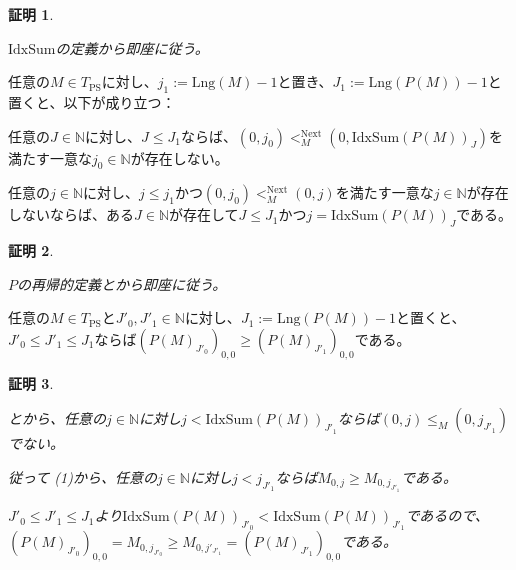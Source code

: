 \documentclass[dvipdfmx,uplatex]{jsarticle}
\theoremstyle{customnonumberbreakfortheorem}
\theoremstyle{customnonumberbreakforproof}
\newtheorem{hideableproof}{証明}
\begin{document}
\begin{hideableproof}
	\begin{indented}
		\item \(\textrm{IdxSum}\)の定義から即座に従う。
	\end{indented}
\end{hideableproof}

\begin{corollary}\label{PとIdxSumの合成の特徴付け}
	任意の\(M \in T_{\textrm{PS}}\)に対し、\(j_1 := \textrm{Lng}(M)-1\)と置き、\(J_1 := \textrm{Lng}(P(M))-1\)と置くと、以下が成り立つ：
	\begin{penumerate}
		\item 任意の\(J \in \mathbb{N}\)に対し、\(J \leq J_1\)ならば、\((0,j_0) <_M^{\textrm{Next}} (0,\textrm{IdxSum}(P(M))_J)\)を満たす一意な\(j_0 \in \mathbb{N}\)が存在しない。
		\item 任意の\(j \in \mathbb{N}\)に対し、\(j \leq j_1\)かつ\((0,j_0) <_M^{\textrm{Next}} (0,j)\)を満たす一意な\(j \in \mathbb{N}\)が存在しないならば、ある\(J \in \mathbb{N}\)が存在して\(J \leq J_1\)かつ\(j = \textrm{IdxSum}(P(M))_J\)である。
	\end{penumerate}
\end{corollary}

\begin{hideableproof}
	\begin{indented}
		\item \(P\)の再帰的定義とから即座に従う。
	\end{indented}
\end{hideableproof}

\begin{proposition}[\(P\)の各成分の左端の単調性]\label{Pの各成分の左端の単調性}
	任意の\(M \in T_{\textrm{PS}}\)と\(J'_0,J'_1 \in \mathbb{N}\)に対し、\(J_1 := \textrm{Lng}(P(M))-1\)と置くと、\(J'_0 \leq J'_1 \leq J_1\)ならば\((P(M)_{J'_0})_{0,0} \geq (P(M)_{J'_1})_{0,0}\)である。
\end{proposition}

\begin{hideableproof}
	\begin{indented}
		\item {}とから、任意の\(j \in \mathbb{N}\)に対し\(j < \textrm{IdxSum}(P(M))_{J'_1}\)ならば\((0,j) \leq_M (0,j_{J'_1})\)でない。
		\item 従って (1)から、任意の\(j \in \mathbb{N}\)に対し\(j < j_{J'_1}\)ならば\(M_{0,j} \geq M_{0,j_{J'_1}}\)である。
		\item \(J'_0 \leq J'_1 \leq J_1\)より\(\textrm{IdxSum}(P(M))_{J'_0} < \textrm{IdxSum}(P(M))_{J'_1}\)であるので、\((P(M)_{J'_0})_{0,0} = M_{0,j_{J'_0}} \geq M_{0,j'_{J'_1}} = (P(M)_{J'_1})_{0,0}\)である。
	\end{indented}
\end{hideableproof}
\end{document}
